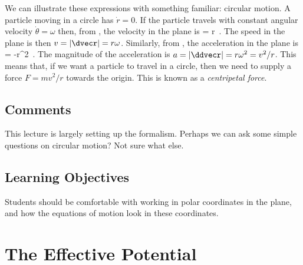 We can illustrate these expressions with something familiar: circular motion. {\co A particle moving in a circle has $\dot{r}=0$. If the particle travels with constant angular velocity $\dot{\theta}=\omega$ then, from , the velocity in the plane is
%
\be \dvecr = r\omega \hattheta\ .\ee
%
The speed in the plane is then $v=|\dvecr| = r\omega$. Similarly, from , the acceleration in the plane is
%
\be \ddvecr = -r\omega^2\hatr\ .\ee
%
The magnitude of the acceleration is $a=|\ddvecr| = r\omega^2=v^2/r$. This means that,  if we want a particle to travel in a circle, then we need to supply a force $F=mv^2/r$ towards the origin. This is known as a {\it centripetal force}.}


\subsection*{Comments}

{\cblue This lecture is largely setting up the formalism. Perhaps we can ask some simple questions on circular motion? Not sure what else.}

\subsection{Learning Objectives}

Students should be comfortable with working in polar coordinates in the plane, and how the equations of motion look in these coordinates. 


\newpage
\section{The Effective Potential}

